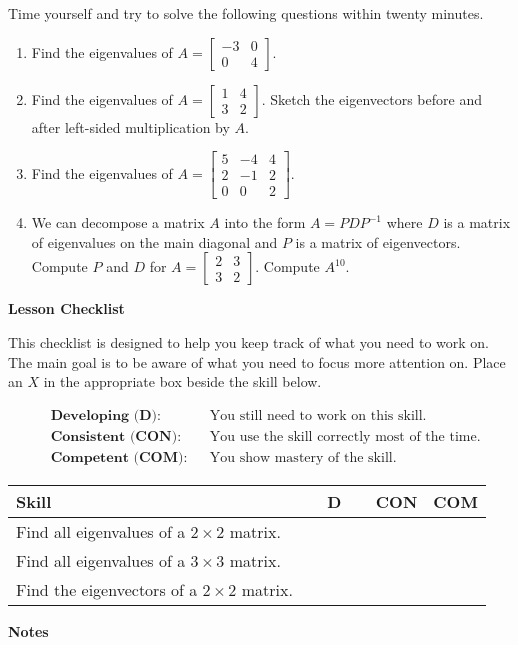 \documentclass[10pt]{book}
\theoremstyle{definition}
\theoremstyle{remark}
\begin{document}
\begin{large}
\noindent
Time yourself and try to solve the following questions within twenty minutes. 
\begin{enumerate}
\item  Find the eigenvalues of $A = \begin{bmatrix}-3&0\\0&4 \end{bmatrix}$.\vfil
\item Find the eigenvalues of $A = \begin{bmatrix}1&4\\3&2 \end{bmatrix}$.   Sketch the eigenvectors before and after left-sided multiplication by $A$. \vfil
\item Find the eigenvalues of $A = \begin{bmatrix}5&-4&4\\2&-1&2\\0&0&2\end{bmatrix}$.\vfil
\item We can decompose a matrix $A$ into the form $A = PDP^{-1}$ where $D$ is a  matrix of eigenvalues on the main diagonal and $P$ is a matrix of eigenvectors. Compute $P$ and $D$ for $A = \begin{bmatrix}2 &3\\3 & 2\end{bmatrix}$. Compute $A^{10}$.\vfil
\end{enumerate}

\noindent
\textbf{Lesson Checklist}
\bigskip

\noindent
This checklist is designed to help you keep track of what you need to work on. The main goal is to be aware of what you need to focus more attention on. Place an $X$ in the appropriate box beside the skill below. 
\bigskip

\noindent
\begin{align*}
&\textbf{Developing (D):} &&\textrm{You still need to work on this skill.}\\
&\textbf{Consistent (CON):} &&\textrm{You use the skill correctly most of the time.}\\
&\textbf{Competent (COM):} &&\textrm{You show mastery of the skill.} 
\end{align*}
\vfil

\begin{center}
\begin{tabular}{|l|l|l|l|}
\hline
\textbf{Skill} & \textbf{~~D~~} & \textbf{CON} & \textbf{COM} \\
\hline
Find all eigenvalues of a $2 \times 2$ matrix.&&&\\
\hline
Find all eigenvalues of a $3\times 3$ matrix.&&&\\
\hline
Find the eigenvectors of a $2\times 2$ matrix.&&&\\
\hline
\end{tabular}
\end{center}
\vfil

\noindent
\textbf{Notes}
\end{large} \vfil
\newpage
\end{document}

